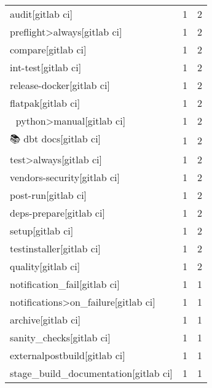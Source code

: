 \begin{tabular}{lrr}
audit[gitlab ci]                           &                   1 &             2 \\
preflight>always[gitlab ci]                &                   1 &             2 \\
compare[gitlab ci]                         &                   1 &             2 \\
int-test[gitlab ci]                        &                   1 &             2 \\
release-docker[gitlab ci]                  &                   1 &             2 \\
flatpak[gitlab ci]                         &                   1 &             2 \\
🐍 python>manual[gitlab ci]                 &                   1 &             2 \\
📚 dbt docs[gitlab ci]                      &                   1 &             2 \\
test>always[gitlab ci]                     &                   1 &             2 \\
vendors-security[gitlab ci]                &                   1 &             2 \\
post-run[gitlab ci]                        &                   1 &             2 \\
deps-prepare[gitlab ci]                    &                   1 &             2 \\
setup[gitlab ci]                           &                   1 &             2 \\
testinstaller[gitlab ci]                   &                   1 &             2 \\
quality[gitlab ci]                         &                   1 &             2 \\
notification\_fail[gitlab ci]               &                   1 &             1 \\
notifications>on\_failure[gitlab ci]        &                   1 &             1 \\
archive[gitlab ci]                         &                   1 &             1 \\
sanity\_checks[gitlab ci]                   &                   1 &             1 \\
externalpostbuild[gitlab ci]               &                   1 &             1 \\
stage\_build\_documentation[gitlab ci]       &                   1 &             1 \\

\end{tabular}

